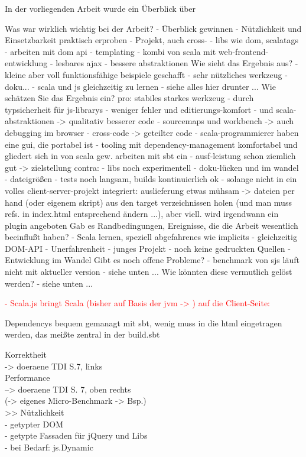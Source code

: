 \documentclass[a4paper, 12pt, hidelinks, listof=totoc, listoftables=totoc, bibliography=totoc]{scrreprt}
\newcommand{\TODO}[1]{\textcolor{red}{#1}\newline}
\begin{document}
In der vorliegenden Arbeit wurde ein Überblick über 

Was war wirklich wichtig bei der Arbeit?
- Überblick gewinnen
- Nützlichkeit und Einsetzbarkeit praktisch erproben
	- Projekt, auch cross-
	- libs wie dom, scalatags
	- arbeiten mit dom api
	- templating
	- kombi von scala mit web-frontend-entwicklung
		- lesbares ajax
		- bessere abstraktionen
Wie sieht das Ergebnis aus?
- kleine aber voll funktionsfähige beispiele geschafft
- sehr nützliches werkzeug
- doku...
- scala und js gleichzeitig zu lernen
- siehe alles hier drunter ...
Wie schätzen Sie das Ergebnis ein?
pro: stabiles starkes werkzeug
	- durch typsicherheit für js-librarys - weniger fehler und editierungs-komfort
	- und scala-abstraktionen -> qualitativ besserer code
	- sourcemaps und workbench -> auch debugging im browser
	- cross-code -> geteilter code
	- scala-programmierer haben eine gui, die portabel ist
	- tooling mit dependency-management komfortabel und gliedert sich in von scala gew. arbeiten mit sbt ein
	- ausf-leistung schon ziemlich gut
-> zielstellung
contra:
	- libs noch experimentell
	- doku-lücken und im wandel
	- dateigrößen
	- tests noch langsam, builds kontinuierlich ok
	- solange nicht in ein volles client-server-projekt integriert: auslieferung etwas mühsam -> dateien per hand (oder eigenem skript) aus den target verzeichnissen holen (und man muss refs. in index.html entsprechend ändern ...), aber viell. wird irgendwann ein plugin angeboten
Gab es Randbedingungen, Ereignisse, die die Arbeit wesentlich beeinflußt haben?
- Scala lernen, speziell abgefahrenes wie implicits
- gleichzeitig DOM-API
- Unerfahrenheit
- junges Projekt
	- noch keine gedruckten Quellen
	- Entwicklung im Wandel
Gibt es noch offene Probleme?
- benchmark von sjs läuft nicht mit aktueller version
- siehe unten ...
Wie könnten diese vermutlich gelöst werden?
- siehe unten ...





\TODO{- Scala.js bringt Scala (bisher auf Basis der jvm -> %
) auf die Client-Seite:}


Dependencys bequem gemanagt mit sbt, wenig muss in die html eingetragen werden, das meißte zentral in der build.sbt


   Korrektheit \\
	-> doeraene TDI S.7, links \\
   Performance \\
	--> doeraene TDI S. 7, oben rechts \\
	(-> eigenes Micro-Benchmark -> Bsp.) \\
>> Nützlichkeit \\
	- getypter \ac{DOM} \\
	- getypte Fassaden für jQuery und Libs \\
	- bei Bedarf: js.Dynamic \\
\end{document}
